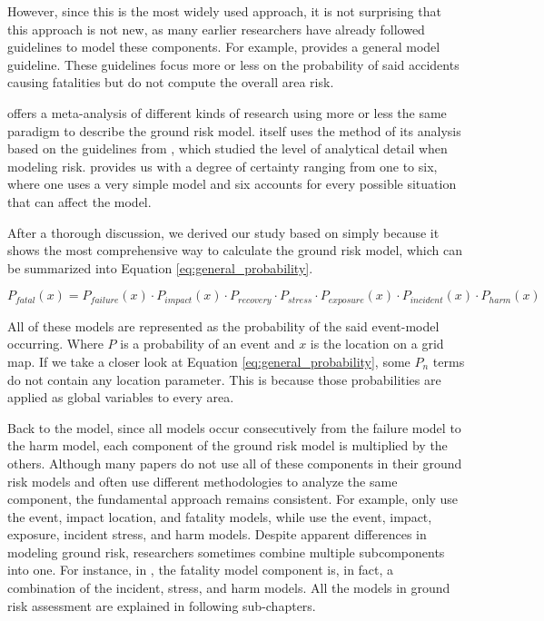 \documentclass[12pt]{report}
\begin{document}
        However, since this is the most widely used approach, it is not surprising that this approach is not new, as
        many earlier researchers have already followed guidelines to model these components. For example,
        \cite{breunig_modeling_2018} provides a general model guideline. These guidelines focus more or less on the
        probability of said accidents causing fatalities but do not compute the overall area risk.
            
        \cite{washington_review_2017} offers a meta-analysis of different kinds of research using more or less the same
        paradigm to describe the ground risk model. \cite{washington_review_2017} itself uses the method of its analysis
        based on the guidelines from \cite{pat-cornell_uncertainties_1996}, which studied the level of analytical detail
        when modeling risk. \cite{pat-cornell_uncertainties_1996} provides us with a degree of certainty ranging from
        one to six, where one uses a very simple model and six accounts for every possible situation that can affect the
        model.
            
        After a thorough discussion, we derived our study based on \cite{primatesta_ground_2020} simply because it shows
        the most comprehensive way to calculate the ground risk model, which can be summarized into Equation
        \ref{eq:general_probability}.
        
        \begin{equation}\label{eq:general_probability}
            P_{fatal}(x) = P_{failure}(x) \cdot P_{impact}(x) \cdot P_{recovery} \cdot P_{stress} \cdot P_{exposure}(x) \cdot P_{incident}(x) \cdot P_{harm}(x)
        \end{equation}
        
        All of these models are represented as the probability of the said event-model occurring. Where \(P\) is a
        probability of an event and \(x\) is the location on a grid map. If we take a closer look at Equation
        \ref{eq:general_probability}, some \(P_n\) terms do not contain any location parameter. This is because those
        probabilities are applied as global variables to every area. 
        
        Back to the model, since all models occur consecutively from the failure model to the harm model, each component
        of the ground risk model is multiplied by the others. Although many papers do not use all of these components in
        their ground risk models and often use different methodologies to analyze the same component, the fundamental
        approach remains consistent. For example, \cite{primatesta_ground_2020} only use the event, impact location, and
        fatality models, while \cite{kim_risk-based_2022} use the event, impact, exposure, incident stress, and harm
        models. Despite apparent differences in modeling ground risk, researchers sometimes combine multiple
        subcomponents into one. For instance, in \cite{primatesta_ground_2020}, the fatality model component is, in
        fact, a combination of the incident, stress, and harm models. All the models in ground risk assessment are
        explained in following sub-chapters.
\end{document}
